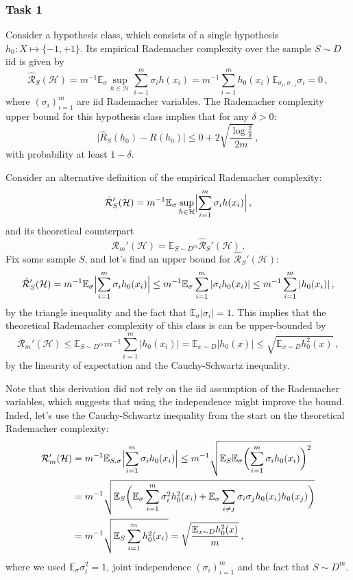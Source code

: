 \documentclass[a4paper]{article}
\newcommand{\ex}{\mathbb{E}}
\newcommand{\Hcal}{\mathcal{H}}
\begin{document}
\subsubsection{Task 1} %
\label{ssub:task_1}

Consider a hypothesis class, which consists of a single hypothesis $h_0:X\mapsto\{-1,+1\}$.
Its empirical Rademacher complexity over the sample $S \sim D$ iid is given by
\[ \hat{\mathcal{R}}_S(\Hcal)
    = m^{-1} \ex_\sigma \sup_{h\in \Hcal} \sum_{i=1}^m \sigma_i h(x_i)
    = m^{-1} \sum_{i=1}^m h_0(x_i) \ex_{\sigma_i, \sigma_{-i}} \sigma_i
    = 0
  \,, \]
where $(\sigma_i)_{i=1}^m$ are iid Rademacher variables. The Rademacher complexity
upper bound for this hypothesis class implies that for any $\delta > 0$:
\[ \bigl|\hat{R}_S(h_0) - R(h_0)\bigr|  
    \leq 0 + 2 \sqrt{\frac{\log\frac{2}{\delta}}{2m}}
    \,, \]
with probability at least $1-\delta$.

Consider an alternative definition of the empirical Rademacher complexity:
\[ \hat{\mathcal{R}}_S'(\Hcal)
    = m^{-1} \ex_\sigma \sup_{h\in \Hcal}
        \Bigl| \sum_{i=1}^m \sigma_i h(x_i) \Bigr|
    \,, \]
and its theoretical counterpart 
\[ \mathcal{R}_m'(\Hcal) = \ex_{S\sim D^m} \hat{\mathcal{R}}_S'(\Hcal)
  \,. \]
Fix some sample $S$, and let's find an upper bound for $\hat{\mathcal{R}}_S'(\Hcal)$:
\[ \hat{\mathcal{R}}_S'(\Hcal)
    = m^{-1} \ex_\sigma \Bigl| \sum_{i=1}^m \sigma_i h_0(x_i) \Bigr|
    \leq m^{-1} \ex_\sigma \sum_{i=1}^m | \sigma_i h_0(x_i) |
    \leq m^{-1} \sum_{i=1}^m |h_0(x_i)|
    \,, \]
by the triangle inequality and the fact that $\ex_\sigma |\sigma_i| = 1$.
This implies that the theoretical Rademacher complexity of this class is can be
upper-bounded by
\[ \mathcal{R}_m'(\Hcal)
  \leq \ex_{S\sim D^m} m^{-1} \sum_{i=1}^m |h_0(x_i)|
  = \ex_{x\sim D} |h_0(x)|
  \leq \sqrt{\ex_{x\sim D} h_0^2(x)}
  \,, \]
by the linearity of expectation and the Cauchy-Schwartz inequality.

Note that this derivation did not rely on the iid assumption of the Rademacher variables,
which suggests that using the independence might improve the bound. Inded, let's
use the Cauchy-Schwartz inequality from the start on the theoretical Rademacher
complexity:
\begin{align*}
  \mathcal{R}_m'(\Hcal)
    &= m^{-1} \ex_{S, \sigma} \Bigl| \sum_{i=1}^m \sigma_i h_0(x_i) \Bigr|
    \leq m^{-1} \sqrt{\ex_S \ex_\sigma \biggl( \sum_{i=1}^m \sigma_i h_0(x_i)\biggr)^2 } \\
    &= m^{-1} \sqrt{\ex_S \biggl(
         \ex_\sigma \sum_{i=1}^m \sigma_i^2 h_0^2(x_i)
        +  \ex_\sigma \sum_{i\neq j} \sigma_i\sigma_j h_0(x_i) h_0(x_j)
      \biggr) } \\
    &= m^{-1} \sqrt{\ex_S \sum_{i=1}^m h_0^2(x_i)}
    = \sqrt{\frac{\ex_{x\sim D} h_0^2(x)}{m}} \,,
\end{align*}
where we used $\ex_\sigma \sigma_i^2 = 1$, joint independence $(\sigma_i)_{i=1}^m$
and the fact that $S\sim D^m$.
\end{document}
